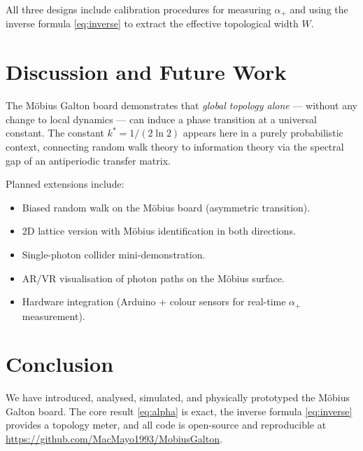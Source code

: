 \documentclass[12pt,a4paper]{article}
\newcommand{\kstar}{k^*}
\newcommand{\alphap}{\alpha_+}
\begin{document}
All three designs include calibration procedures for measuring $\alphap$
and using the inverse formula \eqref{eq:inverse} to extract the effective
topological width $W$.

\section{Discussion and Future Work}
\label{sec:discussion}

The Möbius Galton board demonstrates that \emph{global topology alone} —
without any change to local dynamics — can induce a phase transition at a
universal constant. The constant $\kstar = 1/(2\ln 2)$ appears here in a
purely probabilistic context, connecting random walk theory to information
theory via the spectral gap of an antiperiodic transfer matrix.

Planned extensions include:
\begin{itemize}
  \item Biased random walk on the Möbius board (asymmetric transition).
  \item 2D lattice version with Möbius identification in both directions.
  \item Single-photon collider mini-demonstration.
  \item AR/VR visualisation of photon paths on the Möbius surface.
  \item Hardware integration (Arduino + colour sensors for real-time
        $\alphap$ measurement).
\end{itemize}

\section{Conclusion}

We have introduced, analysed, simulated, and physically prototyped the
Möbius Galton board. The core result \eqref{eq:alpha} is exact, the
inverse formula \eqref{eq:inverse} provides a topology meter, and all
code is open-source and reproducible at
\url{https://github.com/MacMayo1993/MobiusGalton}.
\end{document}
